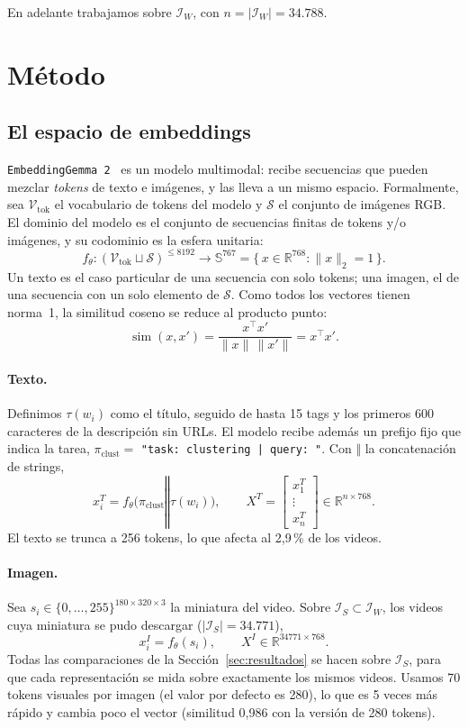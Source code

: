 \documentclass[11pt,a4paper]{article}
\newcommand{\R}{\mathbb{R}}
\newcommand{\Sph}{\mathbb{S}^{767}}
\newcommand{\Tok}{\mathcal{V}_{\mathrm{tok}}}
\newcommand{\Img}{\mathcal{S}}
\newcommand{\concat}{\mathbin{\Vert}}
\newcommand{\simil}{\operatorname{sim}}
\begin{document}
En adelante trabajamos sobre $\mathcal{I}_W$, con $n = |\mathcal{I}_W| = 34.788$.

\section{Método}

\subsection{El espacio de embeddings}
\texttt{EmbeddingGemma~2}~\cite{embgemma2} es un modelo multimodal: recibe secuencias que pueden
mezclar \emph{tokens} de texto e imágenes, y las lleva a un mismo espacio. Formalmente, sea
$\Tok$ el vocabulario de tokens del modelo y $\Img$ el conjunto de imágenes RGB. El dominio del
modelo es el conjunto de secuencias finitas de tokens y/o imágenes, y su codominio es la esfera
unitaria:
\[
  f_\theta : (\Tok \sqcup \Img)^{\le 8192} \longrightarrow \Sph
  = \{\, x \in \R^{768} : \|x\|_2 = 1 \,\}.
\]
Un texto es el caso particular de una secuencia con solo tokens; una imagen, el de una
secuencia con un solo elemento de $\Img$. Como todos los vectores tienen norma~1, la
similitud coseno se reduce al producto punto:
\[
  \simil(x, x') = \frac{x^\top x'}{\|x\|\,\|x'\|} = x^\top x'.
\]

\paragraph{Texto.}
Definimos $\tau(w_i)$ como el título, seguido de hasta 15 tags y los primeros 600 caracteres
de la descripción sin URLs. El modelo recibe además un prefijo fijo que indica la tarea,
$\pi_{\mathrm{clust}} = $ \texttt{"task: clustering | query: "}. Con $\concat$ la
concatenación de strings,
\[
  x_i^{T} = f_\theta\big(\pi_{\mathrm{clust}} \concat \tau(w_i)\big), \qquad
  X^{T} = \begin{bmatrix} x_1^{T} \\ \vdots \\ x_n^{T} \end{bmatrix} \in \R^{n \times 768}.
\]
El texto se trunca a 256 tokens, lo que afecta al 2,9\,\% de los videos.

\paragraph{Imagen.}
Sea $s_i \in \{0, \dots, 255\}^{180 \times 320 \times 3}$ la miniatura del video. Sobre
$\mathcal{I}_S \subset \mathcal{I}_W$, los videos cuya miniatura se pudo descargar
($|\mathcal{I}_S| = 34.771$),
\[
  x_i^{I} = f_\theta(s_i), \qquad X^{I} \in \R^{34771 \times 768}.
\]
Todas las comparaciones de la Sección~\ref{sec:resultados} se hacen sobre $\mathcal{I}_S$, para
que cada representación se mida sobre exactamente los mismos videos.
Usamos 70 tokens visuales por imagen (el valor por defecto es 280), lo que es 5 veces más
rápido y cambia poco el vector (similitud 0,986 con la versión de 280 tokens).
\end{document}
